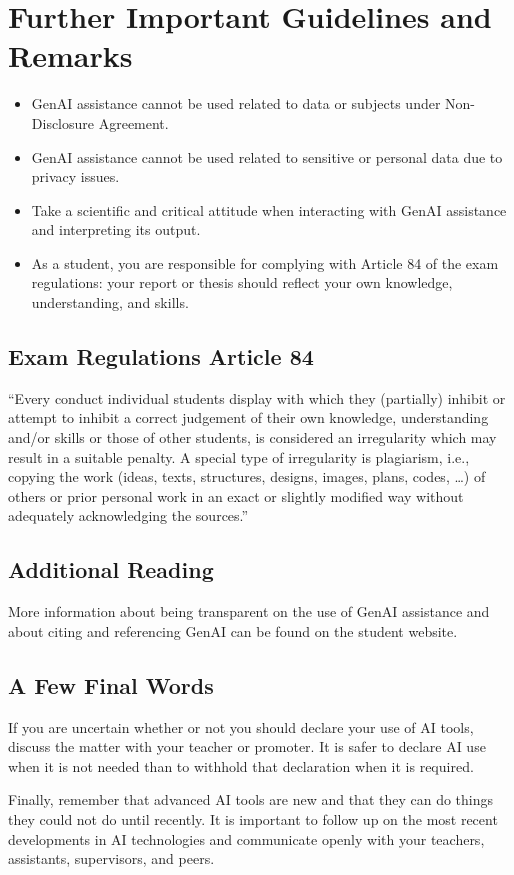 \section*{Further Important Guidelines and Remarks}
\begin{itemize}
    \item GenAI assistance cannot be used related to data or subjects under Non-Disclosure Agreement.
    \item GenAI assistance cannot be used related to sensitive or personal data due to privacy issues.
    \item Take a scientific and critical attitude when interacting with GenAI assistance and interpreting its output.
    \item As a student, you are responsible for complying with Article 84 of the exam regulations: your report or thesis should reflect your own knowledge, understanding, and skills.
\end{itemize}

\subsection*{Exam Regulations Article 84}
``Every conduct individual students display with which they (partially) inhibit or attempt to inhibit a correct judgement of their own knowledge, understanding and/or skills or those of other students, is considered an irregularity which may result in a suitable penalty. A special type of irregularity is plagiarism, i.e., copying the work (ideas, texts, structures, designs, images, plans, codes, \ldots) of others or prior personal work in an exact or slightly modified way without adequately acknowledging the sources.''

\subsection*{Additional Reading}
More information about being transparent on the use of GenAI assistance and about citing and referencing GenAI can be found on the student website.

\subsection*{A Few Final Words}
If you are uncertain whether or not you should declare your use of AI tools, discuss the matter with your teacher or promoter. It is safer to declare AI use when it is not needed than to withhold that declaration when it is required.

Finally, remember that advanced AI tools are new and that they can do things they could not do until recently. It is important to follow up on the most recent developments in AI technologies and communicate openly with your teachers, assistants, supervisors, and peers.
